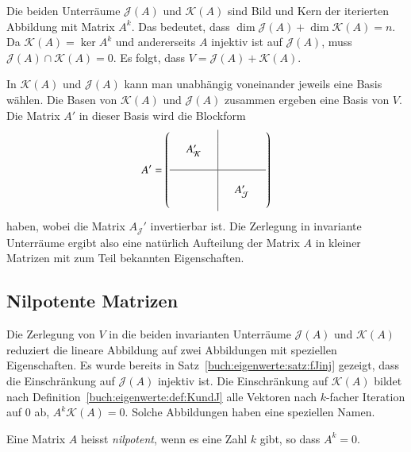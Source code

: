 Die beiden Unterräume $\mathcal{J}(A)$ und $\mathcal{K}(A)$
sind Bild und Kern der iterierten Abbildung mit Matrix $A^k$.
Das bedeutet, dass $\dim\mathcal{J}(A)+\dim\mathcal{K}(A)=n$.
Da $\mathcal{K}(A)=\ker A^k$ und andererseits $A$ injektiv ist auf
$\mathcal{J}(A)$, muss $\mathcal{J}(A)\cap\mathcal{K}(A)=0$.
Es folgt, dass $V=\mathcal{J}(A) + \mathcal{K}(A)$.

In $\mathcal{K}(A)$ und $\mathcal{J}(A)$ kann man unabhängig voneinander
jeweils eine Basis wählen.
Die Basen von $\mathcal{K}(A)$ und $\mathcal{J}(A)$ zusammen ergeben
eine Basis von $V$.
Die Matrix $A'$ in dieser Basis wird die Blockform
\[
A'
=
\left(
\begin{array}{ccc|ccc}
&&&&&\\
&A'_{\mathcal{K}}&&&&\\
&&&&&\\
\hline
&&&&&\\
&&&&A'_{\mathcal{J}}&\\
&&&&&\\
\end{array}
\right)
\]
haben, wobei die Matrix $A_\mathcal{J}'$ invertierbar ist.
Die Zerlegung in invariante Unterräume ergibt also eine natürlich
Aufteilung der Matrix $A$ in kleiner Matrizen mit zum Teil bekannten
Eigenschaften.

%
%
\subsection{Nilpotente Matrizen
\label{buch:subsection:nilpotente-matrizen}}
Die Zerlegung von $V$ in die beiden invarianten Unterräume $\mathcal{J}(A)$
und $\mathcal{K}(A)$ reduziert die lineare Abbildung auf zwei Abbildungen
mit speziellen Eigenschaften.
Es wurde bereits in Satz~\ref{buch:eigenwerte:satz:fJinj} gezeigt,
dass die Einschränkung auf $\mathcal{J}(A)$ injektiv ist.
Die Einschränkung auf $\mathcal{K}(A)$ bildet nach
Definition~\ref{buch:eigenwerte:def:KundJ} alle
Vektoren nach $k$-facher Iteration auf $0$ ab, $A^k\mathcal{K}(A)=0$.
Solche Abbildungen haben eine speziellen Namen.

\begin{definition}
\label{buch:eigenwerte:def:nilpotent}
Eine Matrix $A$ heisst {\em nilpotent}, wenn es eine Zahl $k$ gibt, so dass
$A^k=0$.
%
\end{definition}

